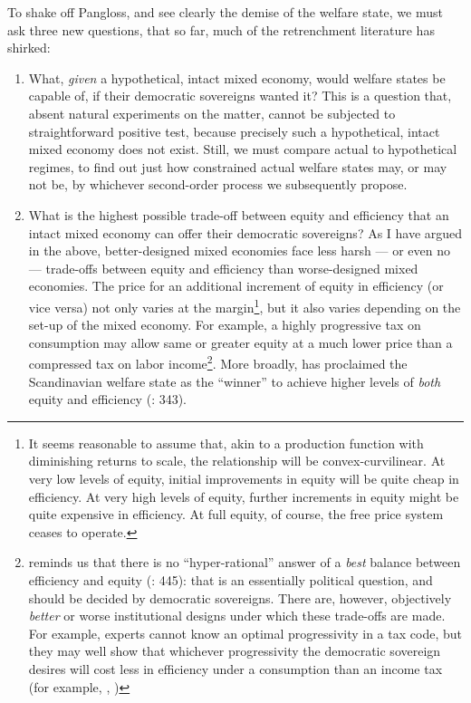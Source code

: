 
To shake off Pangloss, and see clearly the demise of the welfare state, we must ask three new questions, that so far, much of the retrenchment literature has shirked:
\begin{enumerate}
	\item What, \emph{given} a hypothetical, intact mixed economy, would welfare states be capable of, if their democratic sovereigns wanted it? This is a question that, absent natural experiments on the matter, cannot be subjected to straightforward positive test, because precisely such a hypothetical, intact mixed economy does not exist. Still, we must compare actual to hypothetical regimes, to find out just how constrained actual welfare states may, or may not be, by whichever second-order process we subsequently propose.

	\item What is the highest possible trade-off between equity and efficiency that an intact mixed economy can offer their democratic sovereigns? As I have argued in the above, better-designed mixed economies face less harsh --- or even no --- trade-offs between equity and efficiency than worse-designed mixed economies. The price for an additional increment of equity in efficiency (or vice versa) not only varies at the margin\footnote{
		It seems reasonable to assume that, akin to a production function with diminishing returns to scale, the relationship will be convex-curvilinear. At very low levels of equity, initial improvements in equity will be quite cheap in efficiency. At very high levels of equity, further increments in equity might be quite expensive in efficiency. At full equity, of course, the free price system ceases to operate.},
	but it also varies depending on the set-up of the mixed economy. For example, a highly progressive tax on consumption may allow same or greater equity at a much lower price than a compressed tax on labor income\footnote{
		\citeauthor{Offe2003} reminds us that there is no ``hyper-rational'' answer of a \emph{best} balance between efficiency and equity (\citeyear{Offe2003}: 445): that is an essentially political question, and should be decided by democratic sovereigns. There are, however, objectively \emph{better} or {worse} institutional designs under which these trade-offs are made. For example, experts cannot know an optimal progressivity in a tax code, but they may well show that whichever progressivity the democratic sovereign desires will cost less in efficiency under a consumption than an income tax (for example, \citealt{McCaffery2005}, \citealt{Frank2005})}.
	More broadly, \citeauthor{Ganssmann2010} has proclaimed the Scandinavian welfare state as the ``winner'' to achieve higher levels of \emph{both} equity and efficiency (\citeyear{Ganssmann2010}: 343).


\end{enumerate}
